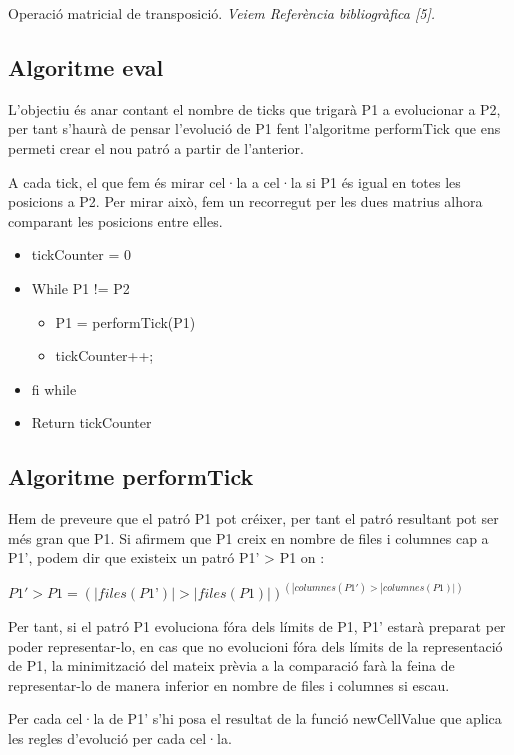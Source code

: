\documentclass[12pt,a4paper]{report}
\begin{document}
Operació matricial de transposició. \textit{Veiem Referència bibliogràfica [5].}

\subsection{Algoritme eval}

L’objectiu és anar contant el nombre de ticks que trigarà P1 a evolucionar a P2, per tant s’haurà de pensar l’evolució de P1 fent l’algoritme performTick que ens permeti crear el nou patró a partir de l’anterior.

A cada tick, el que fem és mirar cel·la a cel·la si P1 és igual en totes les posicions a P2. Per mirar això, fem un recorregut per les dues matrius alhora comparant les posicions entre elles.

\begin{itemize}
\item tickCounter = 0
\item While P1 != P2
	\begin{itemize}
	\item P1 = performTick(P1)
	\item tickCounter++;
	\end{itemize}
\item fi while
\item Return tickCounter
\end{itemize}

\subsection{Algoritme performTick}

Hem de preveure que el patró P1 pot créixer, per tant el patró resultant pot ser més gran que P1. Si afirmem que P1 creix en nombre de files i columnes cap a P1', podem dir que existeix un patró P1’ > P1 on :

\begin{center}
$P1' > P1 = (|files(P1’)|>|files(P1)|) ^ (|columnes(P1')>|columnes(P1)|)$
\end{center}

Per tant, si el patró P1 evoluciona fóra dels límits de P1, P1’ estarà preparat per poder representar-lo, en cas que no evolucioni fóra dels límits de la representació de P1, la minimització del mateix prèvia a la comparació farà la feina de representar-lo de manera inferior en nombre de files i columnes si escau.

Per cada cel·la de P1’ s’hi posa el resultat de la funció newCellValue que aplica les regles d’evolució per cada cel·la.
\end{document}
